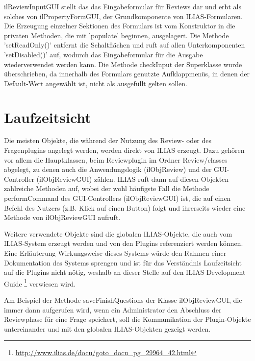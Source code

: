 \documentclass[a4paper]{scrreprt}
\begin{document}
ilReviewInputGUI stellt das das Eingabeformular für Reviews dar und erbt als solches von ilPropertyFormGUI, der Grundkomponente von ILIAS-Formularen. 
Die Erzeugung einzelner Sektionen des Formulars ist vom Konstruktor in die privaten Methoden, die mit 'populate' beginnen, ausgelagert. 
Die Methode 'setReadOnly()' entfernt die Schaltflächen und ruft auf allen Unterkomponenten 'setDisabled()' auf, wodurch das Eingabeformular für die Ausgabe wiederverwendet werden kann.
Die Methode checkInput der Superklasse wurde überschrieben, da innerhalb des Formulars genutzte Aufklappmenüs, in denen der Default-Wert angewählt ist, nicht als ausgefüllt gelten sollen.

\chapter{Laufzeitsicht}

Die meisten Objekte, die während der Nutzung des Review- oder des Fragenplugins angelegt werden, werden direkt von ILIAS erzeugt. 
Dazu gehören vor allem die Hauptklassen, beim Reviewplugin im Ordner Review/classes abgelegt, zu denen auch die Anwendungslogik (ilObjReview) und der GUI-Controller (ilObjReviewGUI) zählen. 
ILIAS ruft dann auf diesen Objekten zahlreiche Methoden auf, wobei der wohl häufigste Fall die Methode performCommand des GUI-Controllers (ilObjReviewGUI) ist, die auf einen Befehl des Nutzers (z.B. Klick auf einen Button) folgt und ihrerseits wieder eine Methode von ilObjReviewGUI aufruft. 

Weitere verwendete Objekte sind die globalen ILIAS-Objekte, die auch vom ILIAS-System erzeugt werden und von den Plugins referenziert werden können. 
Eine Erläuterung Wirkungsweise dieses Systems würde den Rahmen einer Dokumentation des Systems sprengen und ist für das Verständnis Laufzeitsicht auf die Plugins nicht nötig, weshalb an dieser Stelle auf den ILIAS Development Guide \footnote{\url{http://www.ilias.de/docu/goto_docu_pg_29964_42.html}} verwiesen wird.

Am Beispiel der Methode saveFinishQuestions der Klasse ilObjReviewGUI, die immer dann aufgerufen wird, wenn ein Administrator den Abschluss der Reviewphase für eine Frage speichert, soll die Kommunikation der Plugin-Objekte untereinander und mit den globalen ILIAS-Objekten gezeigt werden.
\end{document}
